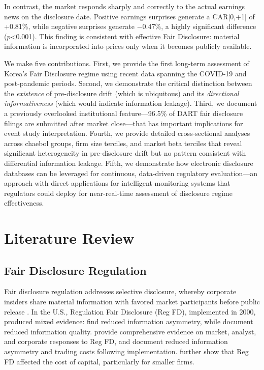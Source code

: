 \documentclass[manuscript,review]{acmart}
\begin{document}
In contrast, the market responds sharply and correctly to the actual earnings news on the disclosure date. Positive earnings surprises generate a CAR[0,+1] of +0.81\%, while negative surprises generate $-$0.47\%, a highly significant difference ($p$<0.001). This finding is consistent with effective Fair Disclosure: material information is incorporated into prices only when it becomes publicly available.

We make five contributions. First, we provide the first long-term assessment of Korea's Fair Disclosure regime using recent data spanning the COVID-19 and post-pandemic periods. Second, we demonstrate the critical distinction between the \textit{existence} of pre-disclosure drift (which is ubiquitous) and its \textit{directional informativeness} (which would indicate information leakage). Third, we document a previously overlooked institutional feature---96.5\% of DART fair disclosure filings are submitted after market close---that has important implications for event study interpretation. Fourth, we provide detailed cross-sectional analyses across chaebol groups, firm size terciles, and market beta terciles that reveal significant heterogeneity in pre-disclosure drift but no pattern consistent with differential information leakage. Fifth, we demonstrate how electronic disclosure databases can be leveraged for continuous, data-driven regulatory evaluation---an approach with direct applications for intelligent monitoring systems that regulators could deploy for near-real-time assessment of disclosure regime effectiveness.

\section{Literature Review}

\subsection{Fair Disclosure Regulation}

Fair disclosure regulation addresses selective disclosure, whereby corporate insiders share material information with favored market participants before public release \cite{heflin2003regulation}. In the U.S., Regulation Fair Disclosure (Reg FD), implemented in 2000, produced mixed evidence: \citet{ahmed2003impact} find reduced information asymmetry, while \citet{heflin2003regulation} document reduced information quality. \citet{bailey2003regulation} provide comprehensive evidence on market, analyst, and corporate responses to Reg FD, and \citet{eleswarapu2004impact} document reduced information asymmetry and trading costs following implementation. \citet{gomes2007sec} further show that Reg FD affected the cost of capital, particularly for smaller firms.
\end{document}
